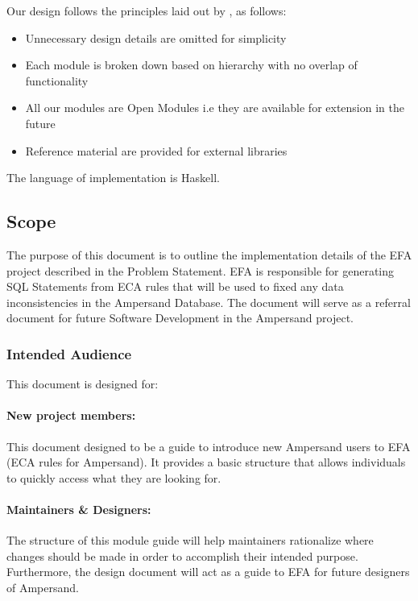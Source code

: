 \documentclass[12pt, svgnames]{article}
\begin{document}

Our design follows the principles laid out by \citep{modStruct}, as follows:
\begin{itemize}
\item Unnecessary design details are omitted for simplicity
\item Each module is broken down based on hierarchy with no overlap of functionality
\item All our modules are Open Modules i.e they are available for extension in the future
\item Reference material are provided for external libraries
\end{itemize}

The language of implementation is Haskell.

\subsection{Scope}
The purpose of this document is to outline the implementation details of the EFA project described in the Problem Statement.
EFA is responsible for generating SQL Statements from ECA rules that will 
be used to fixed any data inconsistencies in the Ampersand Database. 
The document will serve as a referral document for future Software Development in the Ampersand project.

\subsubsection{Intended Audience}
This document is designed for:
\paragraph{New project members:}
This document designed to be a guide to introduce new Ampersand users to EFA 
(ECA rules for Ampersand). It provides a basic structure that allows 
individuals to quickly access what they are looking for.
   
\paragraph{Maintainers \& Designers:} The structure of this module guide will 
help maintainers rationalize where changes should be made in order to 
accomplish their intended purpose. Furthermore, the design document will act as 
a guide to EFA for future designers of Ampersand.
\end{document}
